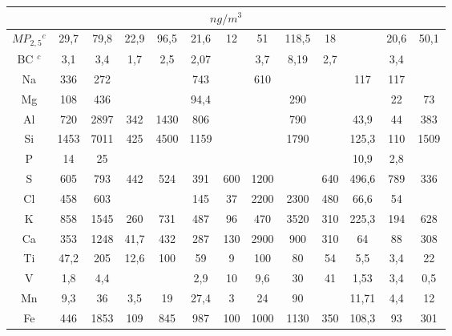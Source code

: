 \begin{tabular}{ccccccccccccc}
\hline
\multicolumn{13}{c}{$ng / m^3$} \\
\hline
$MP_{2,5} {^c}$&29,7   & 79,8       & 22,9             & 96,5 &21,6   & 12     & 51    & 118,5 & 18    &        & 20,6    & 50,1  \\
BC $^c$   & 3,1        & 3,4        & 1,7              & 2,5  &2,07   &        & 3,7   & 8,19  & 2,7   &        & 3,4     &       \\
Na        & 336        & 272        &                  &      &743    &        & 610   &       &       & 117    & 117     &       \\
Mg        & 108        & 436        &                  &      &94,4   &        &       & 290   &       &        & 22      & 73    \\
Al        & 720        & 2897       & 342              & 1430 &806    &        &       & 790   &       & 43,9   & 44      & 383   \\
Si        & 1453       & 7011       & 425              & 4500 &1159   &        &       & 1790  &       & 125,3  & 110     & 1509  \\
P         & 14         & 25         &                  &      &       &        &       &       &       & 10,9   & 2,8     &       \\
S         & 605        & 793        & 442              & 524  &391    & 600    & 1200  &       & 640   & 496,6  & 789     & 336   \\
Cl        & 458        & 603        &                  &      &145    & 37     & 2200  & 2300  & 480   & 66,6   & 54      &       \\
K         & 858        & 1545       & 260              & 731  &487    & 96     & 470   & 3520  & 310   & 225,3  & 194     & 628   \\
Ca        & 353        & 1248       & 41,7             & 432  &287    & 130    & 2900  & 900   & 310   & 64     & 88      & 308   \\
Ti        & 47,2       & 205        & 12,6             & 100  &59     & 9      & 100   & 80    & 54    & 5,5    & 3,4     & 22    \\
V         & 1,8        & 4,4        &                  &      &2,9    & 10     & 9,6   & 30    & 41    & 1,53   & 3,4     & 0,5   \\
Mn        & 9,3        & 36         & 3,5              & 19   &27,4   & 3      & 24    & 90    &       & 11,71  & 4,4     & 12    \\
Fe        & 446        & 1853       & 109              & 845  &987    & 100    & 1000  & 1130  & 350   & 108,3  & 93      & 301   \\

\end{tabular}
